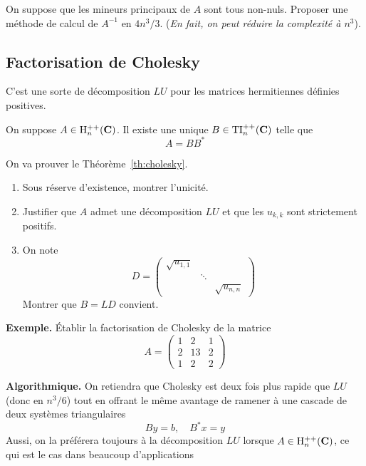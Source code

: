 \begin{exercice}
On suppose que les mineurs principaux de $A$ sont tous non-nuls. Proposer une
méthode de calcul de $A^{-1}$ en $\displaystyle {4n^3}/{3}$. (\emph{En fait,
on peut réduire la complexité à $n^3$}).
\end{exercice}


\subsection{Factorisation de Cholesky}

C'est une sorte de décomposition $LU$ pour les matrices hermitiennes définies
positives.

\begin{theorem}
\label{th:cholesky}
On suppose $A \in \mathrm{H}^{++}_n(\mathbf{C})$. Il existe une unique $B \in \mathrm{TI}^{++}_n(\mathbf{C})$
telle que
\[
A = B B^*
\]
\end{theorem}

\begin{exercice}
On va prouver le Théorème~\ref{th:cholesky}.
\begin{enumerate}
\item Sous réserve d'existence, montrer l'unicité.
\item Justifier que $A$ admet une décomposition $LU$ et que les $u_{k,k}$ sont strictement positifs.
\item On note 
\[
D = \left(\begin{array}{ccc}
\sqrt{u_{1,1}} & & \\
& \ddots & \\
& & \sqrt{u_{n,n}}
\end{array}\right)
\]
Montrer que $B = LD$ convient.
\end{enumerate}
\end{exercice}

{\bf Exemple.}
Établir la factorisation de Cholesky de la matrice
\[
A = \left(\begin{array}{ccc}
1 & 2 & 1 \\
2 & 13 & 2 \\
 1 & 2 & 2
\end{array}\right)
\]

{\bf Algorithmique.}
On retiendra que Cholesky est deux fois plus rapide que $LU$ (donc en
$n^3/6$) tout en offrant le même avantage de ramener à une cascade de deux
systèmes triangulaires
\[
By = b, \quad B^*x = y
\]
Aussi, on la préférera toujours à la décomposition $LU$ lorsque $A \in \mathrm{H}^{++}_n(\mathbf{C})$,
ce qui est le cas dans beaucoup d'applications

